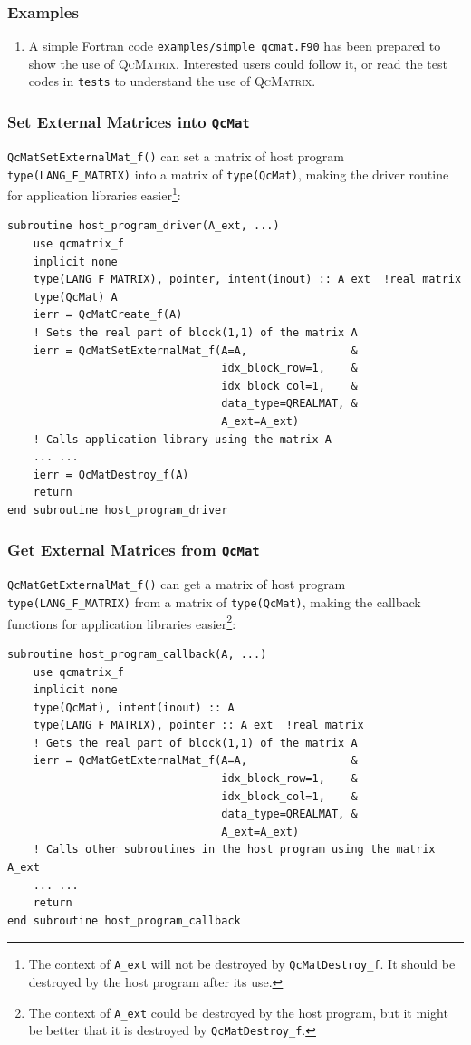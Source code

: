 \documentclass[10pt]{beamer}
\begin{document}
{{\begin{frame}[fragile]
  \frametitle<presentation>{Examples}
  \begin{enumerate}
    \item A simple Fortran code \verb|examples/simple_qcmat.F90| has been prepared
      to show the use of \textsc{QcMatrix}. Interested users could follow it, or read
      the test codes in \verb|tests| to understand the use of \textsc{QcMatrix}.
  \end{enumerate}
\end{frame}

\begin{frame}[fragile]
  \frametitle<presentation>{Set External Matrices into \texttt{QcMat}}
  \small
  \verb|QcMatSetExternalMat_f()| can set a matrix of host program \verb|type(LANG_F_MATRIX)|
  into a matrix of \verb|type(QcMat)|, making the driver routine for application libraries
  easier\footnote{The context of \texttt{A\_ext} will not be destroyed by \texttt{QcMatDestroy\_f}.
  It should be destroyed by the host program after its use.}:
  \footnotesize
  \begin{verbatim}
subroutine host_program_driver(A_ext, ...)
    use qcmatrix_f
    implicit none
    type(LANG_F_MATRIX), pointer, intent(inout) :: A_ext  !real matrix
    type(QcMat) A
    ierr = QcMatCreate_f(A)
    ! Sets the real part of block(1,1) of the matrix A
    ierr = QcMatSetExternalMat_f(A=A,                &
                                 idx_block_row=1,    &
                                 idx_block_col=1,    &
                                 data_type=QREALMAT, &
                                 A_ext=A_ext)
    ! Calls application library using the matrix A
    ... ...
    ierr = QcMatDestroy_f(A)
    return
end subroutine host_program_driver
  \end{verbatim}
\end{frame}

\begin{frame}[fragile]
  \frametitle<presentation>{Get External Matrices from \texttt{QcMat}}
  \small
  \verb|QcMatGetExternalMat_f()| can get a matrix of host program \verb|type(LANG_F_MATRIX)|
  from a matrix of \verb|type(QcMat)|, making the callback functions for application libraries
  easier\footnote{The context of \texttt{A\_ext} could be destroyed by the host program, but
  it might be better that it is destroyed by \texttt{QcMatDestroy\_f}.}:
  \footnotesize
  \begin{verbatim}
subroutine host_program_callback(A, ...)
    use qcmatrix_f
    implicit none
    type(QcMat), intent(inout) :: A
    type(LANG_F_MATRIX), pointer :: A_ext  !real matrix
    ! Gets the real part of block(1,1) of the matrix A
    ierr = QcMatGetExternalMat_f(A=A,                &
                                 idx_block_row=1,    &
                                 idx_block_col=1,    &
                                 data_type=QREALMAT, &
                                 A_ext=A_ext)
    ! Calls other subroutines in the host program using the matrix A_ext
    ... ...
    return
end subroutine host_program_callback
  \end{verbatim}
\end{frame}

}}
\end{document}
